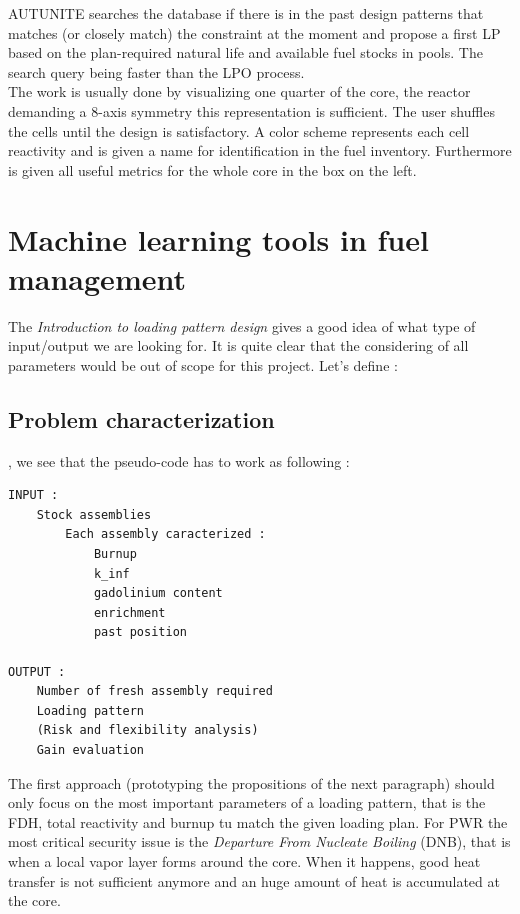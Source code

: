 \noindent AUTUNITE searches the database if there is in the past design patterns that matches (or closely match) the constraint at the moment and propose a first LP based on the plan-required natural life and available fuel stocks in pools. The search query being faster than the LPO process. \\

\noindent The work is usually done by visualizing one quarter of the core, the reactor demanding a 8-axis symmetry this representation is sufficient. The user shuffles the cells until the design is satisfactory. A color scheme represents each cell reactivity and is given a name for identification in the fuel inventory. Furthermore is given all useful metrics for the whole core in the box on the left. 


\section{Machine learning tools in fuel management}

\noindent The \textit{Introduction to loading pattern design} gives a good idea of what type of input/output we are looking for. It is quite clear that the considering of all parameters would be out of scope for this project. Let's define : 

\subsection{Problem characterization}
\cite{ephraim19}, we see that the pseudo-code has to work as following : 
\begin{lstlisting}
INPUT :
    Stock assemblies
        Each assembly caracterized : 
            Burnup
            k_inf
            gadolinium content 
            enrichment 
            past position 

OUTPUT :
    Number of fresh assembly required 
    Loading pattern 
    (Risk and flexibility analysis)
    Gain evaluation 
\end{lstlisting}


\noindent The first approach (prototyping the propositions of the next paragraph) should only focus on the most important parameters of a loading pattern, that is the FDH, total reactivity and burnup tu match the given loading plan. For PWR the most critical security issue is the \textit{Departure From Nucleate Boiling} \cite{DBN} (DNB), that is when a local vapor layer forms around the core. When it happens, good heat transfer is not sufficient anymore and an huge amount of heat is accumulated at the core.






